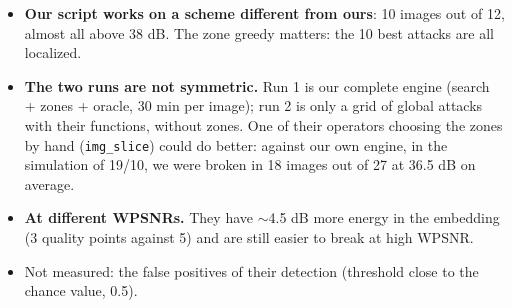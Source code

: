 \documentclass[10pt,a4paper]{article}
\begin{document}
\begin{itemize}\itemsep1pt
\item \textbf{Our script works on a scheme different from ours}: 10 images out of 12, almost all above 38 dB. The zone greedy matters: the 10 best attacks are all localized.
\item \textbf{The two runs are not symmetric.} Run 1 is our complete engine (search + zones + oracle, 30 min per image); run 2 is only a grid of global attacks with their functions, without zones. One of their operators choosing the zones by hand (\texttt{img\_slice}) could do better: against our own engine, in the simulation of 19/10, we were broken in 18 images out of 27 at 36.5 dB on average.
\item \textbf{At different WPSNRs.} They have $\sim$4.5 dB more energy in the embedding (3 quality points against 5) and are still easier to break at high WPSNR.
\item Not measured: the false positives of their detection (threshold close to the chance value, 0.5).
\end{itemize}
\end{document}
